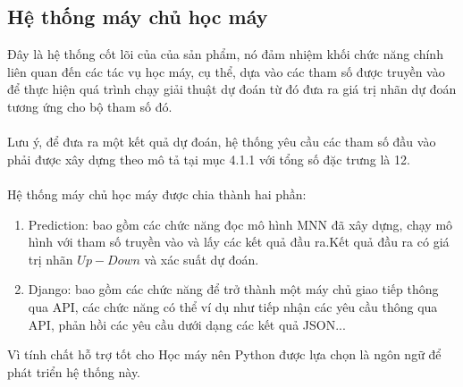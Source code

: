\subsection{Hệ thống máy chủ học máy}
Đây là hệ thống cốt lõi của của sản phẩm, nó đảm nhiệm khối chức năng chính 
liên quan đến các tác vụ học máy, cụ thể, dựa vào các tham số được truyền vào 
để thực hiện quá trình chạy giải thuật dự đoán từ đó đưa ra giá trị nhãn dự 
đoán tương ứng cho bộ tham số đó.\\\\
Lưu ý, để đưa ra một kết quả dự đoán, hệ thống yêu cầu các tham số đầu vào phải 
được xây dựng theo mô tả tại mục 4.1.1 với tổng số đặc trưng là 12.\\\\
Hệ thống máy chủ học máy được chia thành hai phần:
\begin{enumerate}
\item Prediction: bao gồm các chức năng đọc mô hình MNN đã xây dựng, chạy mô 
hình với tham số truyền vào và lấy các kết quả đầu ra.Kết quả đầu ra có giá 
trị nhãn $Up-Down$ và xác suất dự đoán.
\item Django: bao gồm các chức năng để trở thành một máy chủ giao tiếp thông 
qua API, các chức năng có thể ví dụ như tiếp nhận các yêu cầu thông qua API, 
phản hồi các yêu cầu dưới dạng các kết quả JSON...
\end{enumerate}
Vì tính chất hỗ trợ tốt cho Học máy nên Python được lựa chọn là ngôn ngữ để 
phát triển hệ thống này.
